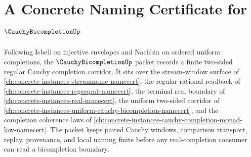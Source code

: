 \chapter{A Concrete Naming Certificate for $\CauchyBicompletionUp$}
\label{ch:concrete-instances-cauchy-bicompletion-namecert}

Following Isbell on injective envelopes and Nachbin on ordered uniform completions, the $\CauchyBicompletionUp$ packet records a finite two-sided regular Cauchy completion corridor. It sits over the stream-window surface of \autoref{ch:concrete-instances-streamname-namecert}, the regular rational readback of \autoref{ch:concrete-instances-regseqrat-namecert}, the terminal real boundary of \autoref{ch:concrete-instances-real-namecert}, the uniform two-sided corridor of \autoref{ch:concrete-instances-uniform-cauchy-bicompletion-namecert}, and the completion coherence laws of \autoref{ch:concrete-instances-cauchy-completion-monad-law-namecert}. The packet keeps paired Cauchy windows, comparison transport, replay, provenance, and local naming finite before any real-completion consumer can read a bicompletion boundary.

